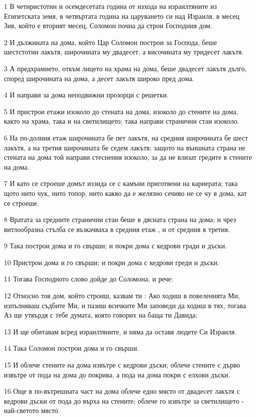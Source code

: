 \par 1 В четиристотин и осемдесетата година от изхода на израилтяните из Египетската земя, в четвъртата година на царуването си над Израиля, в месец Зив, който е вторият месец, Соломон почна да строи Господния дом.
\par 2 И дължината на дома, който Цар Соломон построи за Господа, беше шестстотин лакътя, широчината му двадесет, а височината му тридесет лакътя.
\par 3 А предхрамието, откъм лицето на храма на дома, беше двадесет лакътя дълго, според широчината на дома, а десет лакътя широко пред дома.
\par 4 И направи за дома неподвижни прозорци с решетки.
\par 5 И пристрои етажи изоколо до стената на дома, изоколо до стените на дома, както на храма, така и на светилището; така направи странични стаи изоколо.
\par 6 На по-долния етаж широчината бе пет лакътя, на средния широчината бе шест лакътя, а на третия широчината бе седем лакътя; защото на външната страна не стената на дома той направи стеснения изоколо, за да не влизат гредите в стените на дома.
\par 7 И като се строеше домът иззида се с камъни приготвени на кариерата; така щото нито чук, нито топор, нито какво да е желязно сечиво не се чу в дома, кат се строеше.
\par 8 Вратата за средните странични стаи беше в дясната страна на дома; и чрез витлообразна стълба се възкачваха в средния етаж , и от средния в третия.
\par 9 Така построи дома и го свърши; и покри дома с кедрови гради и дъски.
\par 10 Пристрои дома и го свърши; и покри дома с кедрови греди и дъски.
\par 11 Тогава Господното слово дойде до Соломона, и рече:
\par 12 Относно тоя дом, който строиш, казвам ти : Ако ходиш в повеленията Ми, изпълняваш съдбите Ми, и пазиш всичките Ми заповеди да ходиш в тях, тогава Аз ще утвърдя с тебе думата, която говорих на баща ти Давида;
\par 13 И ще обитавам всред израилтяните, и няма да оставя людете Си Израиля.
\par 14 Така Соломон построи дома и го свърши.
\par 15 И облече стените на дома извътре с кедрови дъски; облече стените с дърво извътре от пода на дома до покрива, а пода на дома покри с елхови дъски.
\par 16 Още в по-вътрешната част на дома облече едно място от двадесет лакътя с кедрови дъски от пода до върха на стените; облече го извътре за светилището - най-светото място.
